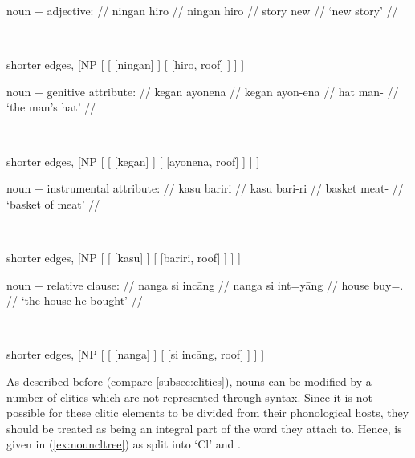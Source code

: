 \pex\label{ex:nounmods}
\a %
	\begin{minipage}[t]{.5\linewidth}
	\begingl
		\glpreamble noun + adjective: //
		\gla ningan hiro //
		\glb ningan hiro //
		\glc story new //
		\glft `new story' //
	\endgl
	\end{minipage}
	~
	\begin{forest} shorter edges,
	[NP
		[
			[
				[{ningan}]
			]
			[{}
				[{hiro}, roof]
			]
		]
	]
	\end{forest}

\a %
	\begin{minipage}[t]{.5\linewidth}
	\begingl
		\glpreamble noun + genitive attribute: //
		\gla kegan ayonena //
		\glb kegan ayon-ena //
		\glc hat man-\Gen{} //
		\glft `the man's hat' //
	\endgl
	\end{minipage}
	~
	\begin{forest} shorter edges,
	[NP
		[
			[
				[{kegan}]
			]
			[{}
				[{ayonena}, roof]
			]
		]
	]
	\end{forest}

\a %
	\begin{minipage}[t]{.5\linewidth}
	\begingl
		\glpreamble noun + instrumental attribute: //
		\gla kasu bariri //
		\glb kasu bari-ri //
		\glc basket meat-\Ins{} //
		\glft `basket of meat' //
	\endgl
	\end{minipage}
	~
	\begin{forest} shorter edges,
	[NP
		[
			[
				[{kasu}]
			]
			[{}
				[{bariri}, roof]
			]
		]
	]
	\end{forest}

\a %
	\begin{minipage}[t]{.5\linewidth}
	\begingl
		\glpreamble noun + relative clause: //
		\gla nanga si incāng //
		\glb nanga si int=yāng //
		\glc house \Rel{} buy=\TsgM{}.\Aarg{} //
		\glft `the house he bought' //
	\endgl
	\end{minipage}
	~
	\begin{forest} shorter edges,
	[NP
		[
			[
				[{nanga}]
			]
			[{}
				[{si incāng}, roof]
			]
		]
	]
	\end{forest}

\xe

As described before (compare \autoref{subsec:clitics}), nouns can be modified
by a number of clitics which are not represented through syntax. Since it is
not possible for these clitic elements to be divided from their phonological
hosts, they should be treated as being an integral part of the word they attach
to. Hence,  is given in (\ref{ex:nouncltree}) as split into `Cl' and
.

